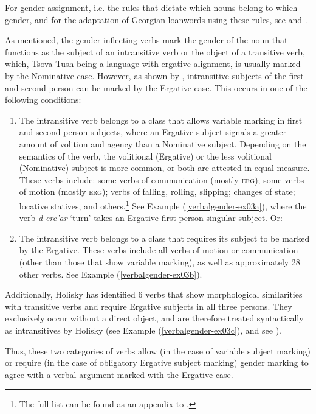 For gender assignment, i.e. the rules that dictate which nouns belong to which gender, and for the adaptation of Georgian loanwords using these rules, see \textcite{WS} and . 

\label{ergintrans}
As mentioned, the gender-inflecting verbs mark the gender of the noun that functions as the subject of an intransitive verb or the object of a transitive verb, which, Tsova-Tush being a language with ergative alignment, is usually marked by the Nominative case. However, as shown by \textcite{holisky87}, intransitive subjects of the first and second person can be marked by the Ergative case. This occurs in one of the following conditions: 
\begin{enumerate}
	\item The intransitive verb belongs to a class that allows variable marking in first and second person subjects, where an Ergative subject signals a greater amount of volition and agency than a Nominative subject. Depending on the semantics of the verb, the volitional (Ergative) or the less volitional (Nominative) subject is more common, or both are attested in equal measure. These verbs include: some verbs of communication (mostly \textsc{erg}); some verbs of motion (mostly \textsc{erg}); verbs of falling, rolling, slipping; changes of state; locative statives, and others.\footnote{The full list can be found as an appendix to \textcites{holisky87}.} See Example (\ref{verbalgender-ex03a}), where the verb \textit{d-erc'ar} `turn' takes an Ergative first person singular subject. Or:
	\item The intransitive verb belongs to a class that requires its subject to be marked by the Ergative. These verbs include all verbs of motion or communication (other than those that show variable marking), as well as approximately 28 other verbs. See Example (\ref{verbalgender-ex03b}). 
\end{enumerate}

Additionally, Holisky has identified 6  verbs that show morphological similarities with transitive verbs and require Ergative subjects in all three persons. They exclusively occur without a direct object, and are therefore  treated syntactically as intransitives by Holisky (see Example (\ref{verbalgender-ex03c}), and see ).

Thus, these two categories of verbs allow (in the case of variable subject marking) or require (in the case of obligatory Ergative subject marking) gender marking to agree with a verbal argument marked with the Ergative case.

